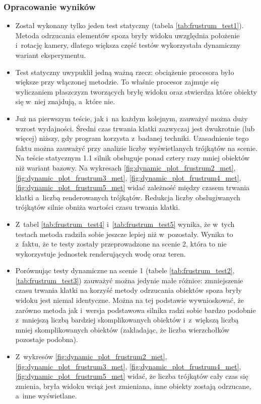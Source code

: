 \documentclass[a4paper,twoside,12pt]{book}
\begin{document}
\subsubsection{Opracowanie wyników}
\begin{itemize}
    \item Został wykonany tylko jeden test statyczny (tabela \ref{tab:frustrum_test1}). Metoda odrzucania elementów spoza bryły widoku uwzględnia położenie i~rotację kamery, dlatego większa część testów wykorzystała dynamiczny wariant eksperymentu.
    \item Test statyczny uwypuklił jedną ważną rzecz: obciążenie procesora było większe przy włączonej metodzie. To właśnie procesor zajmuje się wyliczaniem płaszczyzn tworzących bryłę widoku oraz stwierdza które obiekty się w~niej znajdują, a~które nie.
    \item Już na pierwszym teście, jak i~na każdym kolejnym, zauważyć można duży wzrost wydajności. Średni czas trwania klatki zazwyczaj jest dwukrotnie (lub więcej) niższy, gdy program korzysta z~badanej techniki. Uzasadnienie tego faktu można zauważyć przy analizie liczby wyświetlanych trójkątów na scenie. Na teście statycznym 1.1 silnik obsługuje ponad cztery razy mniej obiektów niż wariant bazowy. Na wykresach \ref{fig:dynamic_plot_frustrum2_met}, \ref{fig:dynamic_plot_frustrum3_met}, \ref{fig:dynamic_plot_frustrum4_met}, \ref{fig:dynamic_plot_frustrum5_met} widać zależność między czasem trwania klatki a~liczbą renderowanych trójkątów. Redukcja liczby obsługiwanych trójkątów silnie obniża wartości czasu trwania klatki.
    \item Z~tabel \ref{tab:frustrum_test4} i~\ref{tab:frustrum_test5} wynika, że w~tych testach metoda radziła sobie jeszcze lepiej niż w~pozostały. Wynika to z~faktu, że te testy zostały przeprowadzone na scenie 2, która to nie wykorzystuje jednostek renderujących wodę oraz teren.
    \item Porównując testy dynamiczne na scenie 1 (tabele \ref{tab:frustrum_test2}, \ref{tab:frustrum_test3}) zauważyć można jedynie małe różnice: zmniejszenie czasu trwania klatki na korzyść metody odrzucania obiektów spoza bryły widoku jest niemal identyczne. Można na tej podstawie wywnioskować, że zarówno metoda jak i~wersja podstawowa silnika radzi sobie bardzo podobnie z~mniejszą liczbą bardziej skomplikowanych obiektów i~z~większą liczbą mniej skomplikowanych obiektów (zakładając, że liczba wierzchołków pozostaje podobna).
    \item Z~wykresów \ref{fig:dynamic_plot_frustrum2_met}, \ref{fig:dynamic_plot_frustrum3_met}, \ref{fig:dynamic_plot_frustrum4_met}, \ref{fig:dynamic_plot_frustrum5_met} widać, że liczba trójkątów cały czas się zmienia, bryła widoku wciąż jest zmieniana, inne obiekty zostają odrzucane, a~inne wyświetlane.

\end{itemize}
\end{document}
